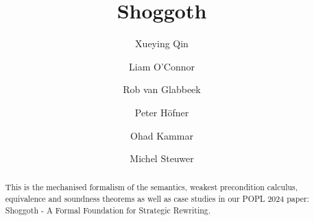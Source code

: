 \documentclass[11pt,a4paper]{article}
\begin{document}
\title{Shoggoth}
\author{Xueying Qin \and Liam O’Connor \and Rob van Glabbeek \and Peter H\"ofner \and Ohad Kammar \and Michel Steuwer}
\maketitle

\begin{abstract}
  This is the mechanised formalism of the semantics, weakest precondition calculus, equivalence and soundness theorems as well as case studies in our POPL 2024 paper: Shoggoth - A Formal Foundation for Strategic Rewriting.
\end{abstract}

\tableofcontents





\end{document}
